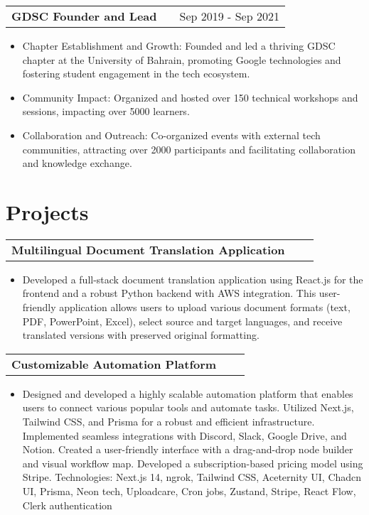 \documentclass[a4paper,11pt]{article}
\makeatletter
\newenvironment{joblong}[2]
    {
    \begin{tabularx}{\linewidth}{@{}l X r@{}}
    \textbf{#1} & \hfill &  #2 \\[3.75pt]
    \end{tabularx}
    \begin{minipage}[t]{\linewidth}
    \begin{itemize}[nosep,after=\strut, leftmargin=1em, itemsep=3pt,label=--]
    }
    {
    \end{itemize}
    \end{minipage}    
    }
\newenvironment{projectlong}[2]
    {
    \begin{tabularx}{\linewidth}{@{}l X r@{}}
    \textbf{#1} & \hfill &  #2 \\[3.75pt]
    \end{tabularx}
    \begin{minipage}[t]{\linewidth}
    \begin{itemize}[nosep,after=\strut, leftmargin=1em, itemsep=3pt,label=--]
    }
    {
    \end{itemize}
    \end{minipage}    
    }
\makeatother
\begin{document}
\begin{joblong}{GDSC Founder and Lead}{Sep 2019 - Sep 2021}
\item Chapter Establishment and Growth: Founded and led a thriving GDSC chapter at the University of Bahrain, promoting Google technologies and fostering student engagement in the tech ecosystem.
\item Community Impact: Organized and hosted over 150 technical workshops and sessions, impacting over 5000 learners.
\item Collaboration and Outreach: Co-organized events with external tech communities, attracting over 2000 participants and facilitating collaboration and knowledge exchange.

\end{joblong}
  
\section{Projects}

\begin{projectlong}{Multilingual Document Translation Application}{}
    \item Developed a full-stack document translation application using React.js for the frontend and a robust Python backend with AWS integration. This user-friendly application allows users to upload various document formats (text, PDF, PowerPoint, Excel), select source and target languages, and receive translated versions with preserved original formatting.
\end{projectlong}

\begin{projectlong}{Customizable Automation Platform}{}
    \item Designed and developed a highly scalable automation platform that enables users to connect various popular tools and automate tasks.
            Utilized Next.js, Tailwind CSS, and Prisma for a robust and efficient infrastructure.
            Implemented seamless integrations with Discord, Slack, Google Drive, and Notion.
            Created a user-friendly interface with a drag-and-drop node builder and visual workflow map.
            Developed a subscription-based pricing model using Stripe.
            Technologies: Next.js 14, ngrok, Tailwind CSS, Aceternity UI, Chadcn UI, Prisma, Neon tech, Uploadcare, Cron jobs, Zustand, Stripe, React Flow, Clerk authentication
\end{projectlong}
\end{document}

